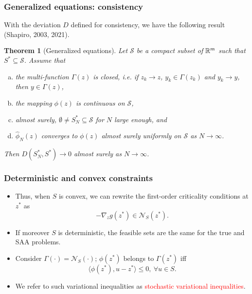 \documentclass[aspectratio=169]{beamer}
\newtheorem{theo}{Theorem}
\begin{document}
\begin{frame}
\frametitle{Generalized equations: consistency}

With the deviation $D$ defined for consistency, we have the following result (Shapiro, 2003, 2021).
\begin{theo}[Generalized equations]
Let $\mathcal{S}$ be a compact subset of $\mathbb{R}^m$ such that $S^* \subseteq \mathcal{S}$.
Assume that
\begin{enumerate}[(a)]
\item
the multi-function $\Gamma(z)$ is closed, i.e. if $z_k \rightarrow z$, $y_k \in \Gamma(z_k)$ and $y_k \rightarrow y$, then $y \in \Gamma(z)$,
\item
the mapping $\phi(z)$ is continuous on $\mathcal{S}$,
\item 
almost surely, $\emptyset \neq S^*_N \subseteq \mathcal{S}$ for $N$ large enough, and
\item
$\hat{\phi}_N(z)$ converges to $\phi(z)$ almost surely uniformly on $\mathcal{S}$ as $N \rightarrow \infty$.
\end{enumerate}
Then $D(S^*_N, S^*) \rightarrow 0$ almost surely as $N \rightarrow \infty$.
\label{th:svi}
\end{theo}

\end{frame}

\begin{frame}
\frametitle{Deterministic and convex constraints}

\begin{itemize}
	\item 
Thus, when $S$ is convex, we can rewrite the first-order criticality conditions at $z^*$ as 
$$
-\nabla_z g(z^*) \in \mathcal{N}_{S}(z^*).
$$
\item 
If moreover $S$ is deterministic, the feasible sets are the same for the true and SAA problems.
\item
Consider %
$\Gamma(\cdot) = \mathcal{N}_S(\cdot)$; $\phi(z^*)$ belongs to $\Gamma(z^*)$ iff
\[
\langle \phi(z^*), u-z^*\rangle \leq 0,\ \forall u \in S.
\]
\item
We refer to such variational inequalities as \textcolor{red}{stochastic variational inequalities}.
\end{itemize}

\end{frame}
\end{document}
